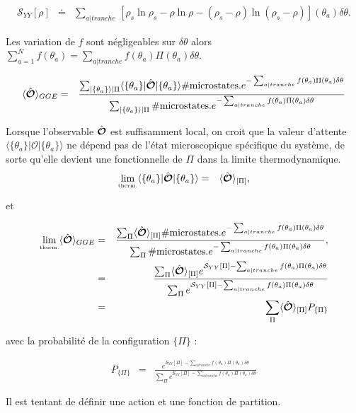 \begin{eqnarray}
    \mathcal{S}_{YY}[\rho] & \doteq & \sum_{a\vert tranche} \, [ \rho_s\ln \rho_s - \rho \ln \rho - ( \rho_s - \rho ) \ln ( \rho_s - \rho ) ] (\theta_a) \delta \theta .
\end{eqnarray}
	
	Les variation de $f$ sont négligeables sur $\delta \theta $ alors  $\sum_{a = 1}^N  f(\theta_a) = \sum_{a \vert tranche } f(\theta_a) \Pi( \theta_a)\delta \theta$.
	
	
	\begin{eqnarray}
		\langle \hat{\bm{\mathcal{O}}} \rangle_{GGE} & =  & \frac{  \sum_{\vert \{\theta_a \}\rangle \vert \Pi } \langle  \{ \theta_a\}  \vert   \hat{\bm{\mathcal{O}}} \vert \{ \theta_a\} \rangle \# \mbox{microstates.} e^{- \sum_{a \vert tranche} f(\theta_a) \Pi ( \theta_a )  \delta \theta}    }{ \sum_{\vert \{\theta_a \}\rangle \vert \Pi }  \# \mbox{microstates.}e^{- \sum_{a \vert tranche }  f(\theta_a) \Pi ( \theta_a ) \delta \theta } }
	\end{eqnarray}
	
	Lorsque l'observable $\hat{\bm{\mathcal{O}}}$ est suffisamment local, on croit que la valeur d'attente $\langle  \{ \theta_a\}  \vert   \mathcal{O} \vert \{ \theta_a\} \rangle$ ne dépend pas de l'état microscopique spécifique du système, de sorte qu'elle devient une fonctionnelle de $\Pi$ dans la limite thermodynamique.
	\begin{eqnarray}
		\underset{\mbox{\tiny therm.}}{\lim} \langle  \{ \theta_a\}  \vert   \hat{\bm{\mathcal{O}}} \vert \{ \theta_a\} \rangle & = & \langle \hat{\bm{\mathcal{O}}}\rangle_{[\Pi]},
	\end{eqnarray}
	
	et 
	
	\begin{eqnarray}
		\underset{\mbox{\tiny therm.}}{\lim} \langle \hat{\bm{\mathcal{O}}} \rangle_{GGE} & =  & \frac{ \sum_{\Pi} \langle \hat{\bm{\mathcal{O}}}\rangle_{[\Pi]} \# \mbox{microstates.} e^{- \sum_{a \vert tranche} f(\theta_a) \Pi ( \theta_a )  \delta \theta}    }{ \sum_{\Pi} \# \mbox{microstates.}  e^{- \sum_{a \vert tranche }  f(\theta_a) \Pi ( \theta_a ) \delta \theta } },\\
		& = & \frac{ \sum_{\Pi} \langle \hat{\bm{\mathcal{O}}}\rangle_{[\Pi]}  e^{ \mathcal{S}_{YY}[\Pi]- \sum_{a \vert tranche} f(\theta_a) \Pi ( \theta_a )  \delta \theta}    }{ \sum_{\Pi}  e^{\mathcal{S}_{YY}[\Pi] - \sum_{a \vert tranche }  f(\theta_a) \Pi ( \theta_a ) \delta \theta } }\\
		& = &  \sum_{\Pi} \langle \hat{\bm{\mathcal{O}}}\rangle_{[\Pi]} P_{\{\Pi\}}
	\end{eqnarray}
	
	avec la probabilité de la configuration $\{ \Pi \}$  : 
	
	\begin{eqnarray}
		P_{\{\Pi\}} & = & \frac{e^{\mathcal{S}_{YY}[\Pi] - \sum_{a \vert tranche }  f(\theta_a) \Pi ( \theta_a ) \delta \theta }}{ \sum_{\Pi}  e^{\mathcal{S}_{YY}[\Pi] - \sum_{a \vert tranche }  f(\theta_a) \Pi ( \theta_a ) \delta \theta } }
	\end{eqnarray}
	
	Il est tentant de définir une action  et une fonction de partition.